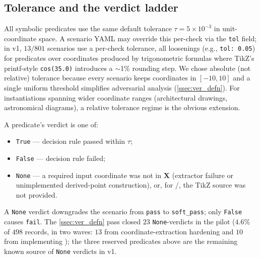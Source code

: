 \subsection{Tolerance and the verdict ladder}

All symbolic predicates use the same default tolerance $\tau = 5\times 10^{-3}$ in unit-coordinate space.
A scenario YAML may override this per-check via the \texttt{tol} field; in v1, $13/801$ scenarios use a per-check tolerance, all loosenings (e.g., \texttt{tol: 0.05}) for predicates over coordinates produced by trigonometric formulas where TikZ's printf-style \texttt{cos(35.0)} introduces a $\sim$1\% rounding step.
We chose absolute (not relative) tolerance because every \GeoGenBench scenario keeps coordinates in $[-10, 10]$ and a single uniform threshold simplifies adversarial analysis (\cref{ssec:ver_defn}).
For \GeoGen instantiations spanning wider coordinate ranges (architectural drawings, astronomical diagrams), a relative tolerance regime is the obvious extension.

A predicate's verdict is one of:
\begin{itemize}
\item \texttt{True} --- decision rule passed within $\tau$;
\item \texttt{False} --- decision rule failed;
\item \texttt{None} --- a required input coordinate was not in $\mathbf{X}$ (extractor failure or unimplemented derived-point construction), or, for /, the TikZ source was not provided.
\end{itemize}
A \texttt{None} verdict downgrades the scenario from \texttt{pass} to \texttt{soft\_pass}; only \texttt{False} causes \texttt{fail}.
The \cref{ssec:ver_defn} pass closed $23$ \texttt{None}-verdicts in the pilot ($4.6\%$ of $498$ records, in two waves: $13$ from coordinate-extraction hardening and $10$ from implementing ); the three reserved predicates above are the remaining known source of \texttt{None} verdicts in \GeoGenBench v1.
